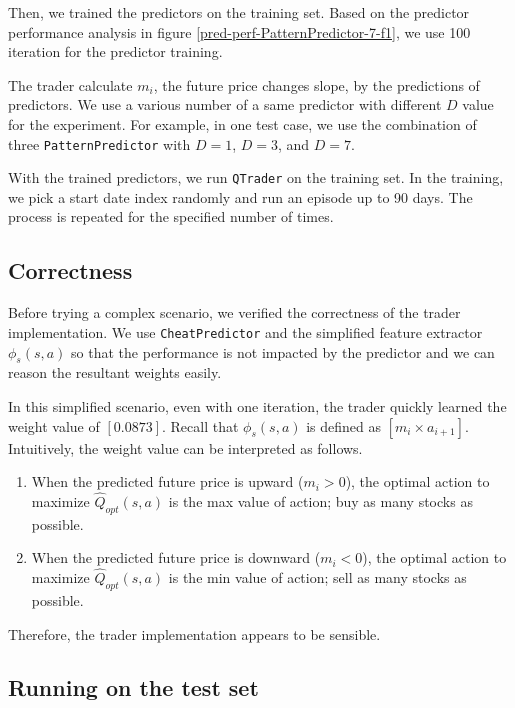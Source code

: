 \documentclass[twocolumn,10pt]{asme2ej}
\begin{document}
Then, we trained the predictors on the training set. Based on the predictor
performance analysis in figure \ref{pred-perf-PatternPredictor-7-f1}, we use 100
iteration for the predictor training.

The trader calculate $m_i$, the future price changes slope, by the
predictions of predictors. We use a various number of a same predictor
with different $D$ value for the experiment. For example, in one test
case, we use the combination of three \verb|PatternPredictor| with
$D=1$, $D=3$, and $D=7$.

With the trained predictors, we run \verb|QTrader| on the training
set. In the training, we pick a start date index randomly and run an
episode up to 90 days. The process is repeated for the specified
number of times.

\subsection{Correctness}

Before trying a complex scenario, we verified the correctness of the
trader implementation. We use \verb|CheatPredictor| and the simplified
feature extractor $\phi_s(s,a)$ so that the performance is not
impacted by the predictor and we can reason the resultant weights
easily.

In this simplified scenario, even with one iteration, the trader
quickly learned the weight value of $[0.0873]$. Recall that
$\phi_s(s,a)$ is defined as $[m_i \times a_{i+1}]$. Intuitively, the
weight value can be interpreted as follows.

\begin{enumerate}
  \item When the predicted future price is upward ($m_i > 0$), the optimal
    action to maximize $\hat{Q}_{opt}(s, a)$ is the max value of action; buy as
    many stocks as possible.

  \item When the predicted future price is downward ($m_i < 0$), the optimal
    action to maximize $\hat{Q}_{opt}(s, a)$ is the min value of action; sell as
    many stocks as possible.
\end{enumerate}

Therefore, the trader implementation appears to be sensible.

\subsection{Running on the test set}
\end{document}
